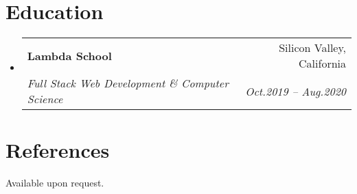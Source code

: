 \documentclass[letterpaper,12pt]{article}
\makeatletter
\newcommand{\resumeSubheading}[4]{
  \vspace{-1pt}\item{
    \begin{tabular*}{0.97\textwidth}{l@{\extracolsep{\fill}}r}
      \textbf{#1} & #2 \\
      \textit{\small#3} & \textit{\small #4} \\
    \end{tabular*}\vspace{-5pt}}
}
\newcommand{\resumeSubHeadingListStart}{\begin{itemize}[leftmargin=*]}
\newcommand{\resumeSubHeadingListEnd}{\end{itemize}}
\makeatother
\begin{document}
  \section{Education}
  \resumeSubHeadingListStart
  \resumeSubheading
  {Lambda School}{Silicon Valley, California}
  {Full Stack Web Development \& Computer Science}{Oct.2019 -- Aug.2020}
  \resumeSubHeadingListEnd

  \section{References}
  Available upon request.

\end{document}
